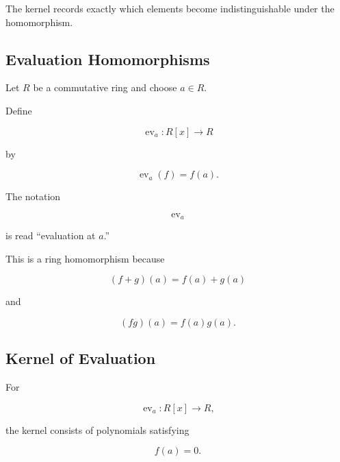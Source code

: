\begin{center}
\end{center}

The kernel records exactly which elements become indistinguishable under the
homomorphism.

\subsection{Evaluation Homomorphisms}
\label{subsec:evaluation-homomorphisms}

Let \(R\) be a commutative ring and choose \(a\in R\).

Define

\[ \operatorname{ev}_a:R[x]\to R \]

by

\[ \operatorname{ev}_a(f)=f(a). \]

The notation

\[ \operatorname{ev}_a \]

is read ``evaluation at \(a\).''

This is a ring homomorphism because

\[ (f+g)(a)=f(a)+g(a) \]

and

\[ (fg)(a)=f(a)g(a). \]

\subsection{Kernel of Evaluation}
\label{subsec:kernel-evaluation}

For

\[ \operatorname{ev}_a:R[x]\to R, \]

the kernel consists of polynomials satisfying

\[ f(a)=0. \]

